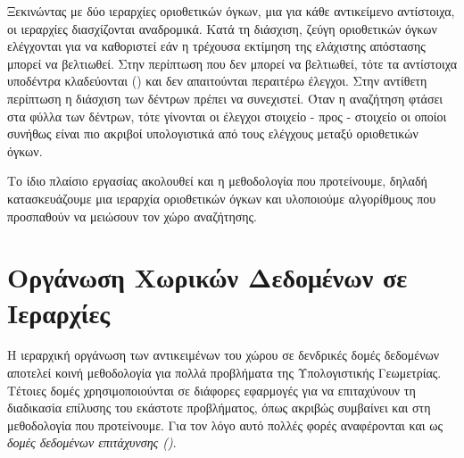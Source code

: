 Ξεκινώντας με δύο ιεραρχίες οριοθετικών όγκων, μια για κάθε αντικείμενο αντίστοιχα, 
οι ιεραρχίες διασχίζονται αναδρομικά.
Κατά τη διάσχιση, ζεύγη οριοθετικών όγκων ελέγχονται για να καθοριστεί εάν 
η τρέχουσα εκτίμηση της ελάχιστης απόστασης μπορεί να βελτιωθεί. 
Στην περίπτωση που δεν μπορεί να βελτιωθεί, τότε τα αντίστοιχα υποδέντρα 
κλαδεύονται () και δεν απαιτούνται περαιτέρω έλεγχοι.
Στην αντίθετη περίπτωση η διάσχιση των δέντρων πρέπει να συνεχιστεί.
Όταν η αναζήτηση φτάσει στα φύλλα των δέντρων, τότε γίνονται οι 
έλεγχοι στοιχείο - προς - στοιχείο οι οποίοι συνήθως είναι πιο 
ακριβοί υπολογιστικά από τους ελέγχους μεταξύ οριοθετικών όγκων.

Το ίδιο πλαίσιο εργασίας ακολουθεί και η μεθοδολογία που προτείνουμε, 
δηλαδή κατασκευάζουμε μια ιεραρχία οριοθετικών όγκων και υλοποιούμε 
αλγορίθμους που προσπαθούν να μειώσουν τον χώρο αναζήτησης.


\section{Οργάνωση Χωρικών Δεδομένων σε Ιεραρχίες}
Η ιεραρχική οργάνωση των αντικειμένων του χώρου σε δενδρικές 
δομές δεδομένων αποτελεί κοινή μεθοδολογία για πολλά προβλήματα 
της Υπολογιστικής Γεωμετρίας. 
Τέτοιες δομές χρησιμοποιούνται σε διάφορες εφαρμογές για να 
επιταχύνουν τη διαδικασία επίλυσης του εκάστοτε προβλήματος, 
όπως ακριβώς συμβαίνει και στη μεθοδολογία που προτείνουμε. 
Για τον λόγο αυτό πολλές φορές αναφέρονται και ως \textit{δομές 
δεδομένων επιτάχυνσης ()}.

